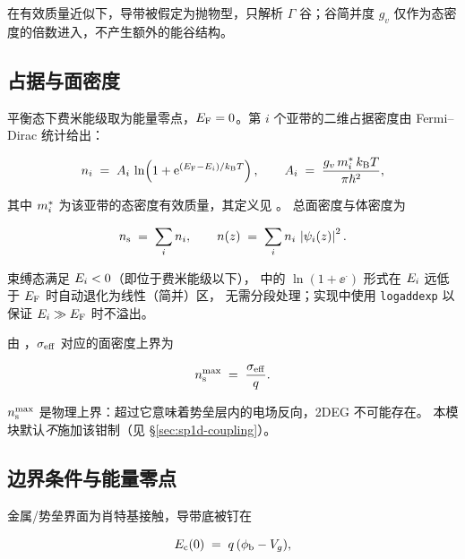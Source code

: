 在有效质量近似下，导带被假定为抛物型，只解析 $\Gamma$ 谷；谷简并度 $g_v$
仅作为态密度的倍数进入，不产生额外的能谷结构。

\subsection{占据与面密度}
\label{sec:sp1d-occupation}

平衡态下费米能级取为能量零点，$E_{\mathrm{F}}=0$。第 $i$ 个亚带的二维占据密度由
Fermi--Dirac 统计给出：

\begin{equation}
n_i \;=\; A_i\,\ln\!\left(1+\mathrm{e}^{(E_{\mathrm{F}}-E_{i})/k_{\mathrm{B}}T}\right),
\qquad
A_i \;=\; \frac{g_v\,m^{*}_i\,k_{\mathrm{B}}T}{\pi\hbar^{2}},
\label{eq:occupation}
\end{equation}

其中 $m^{*}_i$ 为该亚带的态密度有效质量，其定义见 。
总面密度与体密度为

\begin{equation}
n_{\mathrm{s}} \;=\; \sum_i n_i,
\qquad
n(z) \;=\; \sum_i n_i\,\left\lvert \psi_i(z) \right\rvert^{2}.
\label{eq:ns}
\end{equation}

束缚态满足 $E_{i}<0$（即位于费米能级以下）， 中的
$\ln(1+\ee^{\cdot})$ 形式在 $E_{i}$ 远低于 $E_{\mathrm{F}}$ 时自动退化为线性（简并）区，
无需分段处理；实现中使用 \texttt{logaddexp} 以保证 $E_{i}\gg E_{\mathrm{F}}$ 时不溢出。

由 ，$\sigma_{\mathrm{eff}}$ 对应的面密度上界为

\begin{equation}
n_{\mathrm{s}}^{\max} \;=\; \frac{\sigma_{\mathrm{eff}}}{q}.
\label{eq:ns-upper}
\end{equation}

$n_{\mathrm{s}}^{\max}$ 是物理上界：超过它意味着势垒层内的电场反向，2DEG 不可能存在。
本模块默认\emph{不}施加该钳制（见 \S\ref{sec:sp1d-coupling}）。

\subsection{边界条件与能量零点}
\label{sec:sp1d-bc}

金属/势垒界面为肖特基接触，导带底被钉在

\begin{equation}
E_{\mathrm{c}}(0) \;=\; q\,(\phi_{\mathrm{b}} - V_g),
\label{eq:bc-front}
\end{equation}

